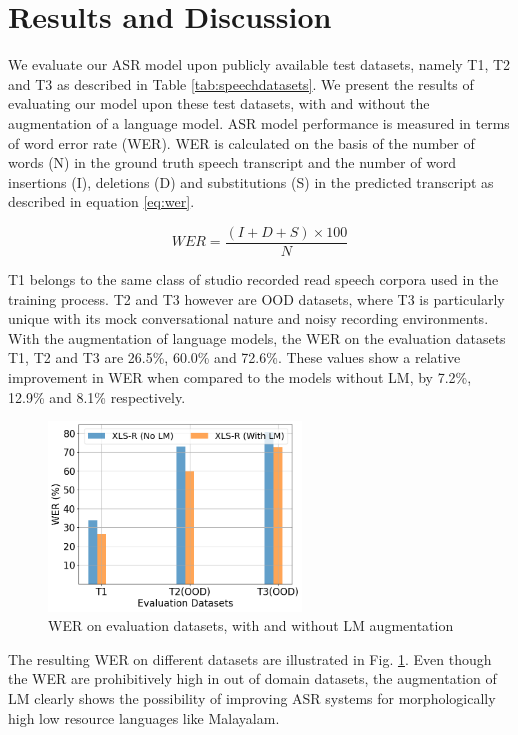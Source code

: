 \documentclass[runningheads]{llncs}
\begin{document}
\section{Results and Discussion}

We evaluate our ASR model upon publicly available test datasets, namely T1, T2 and T3 as described in Table \ref{tab:speechdatasets}.  We present the 
results of evaluating our model upon these test datasets, with and without the augmentation of a language model. ASR model performance is measured in terms of word error rate (WER). WER is calculated on the basis of the number of words (N) in the ground truth speech transcript and the number of word insertions (I), deletions (D) and  substitutions (S)  in the  predicted transcript as described in equation \ref{eq:wer}.

\begin{equation}
	\label{eq:wer}
	WER = \frac{(I+D+S) \times 100}{N}
\end{equation}


T1 belongs to the same class of studio recorded read speech corpora used in the training process. T2 and T3 however are OOD datasets, where T3 is particularly unique with its mock conversational nature and noisy recording environments. With the augmentation of language models, the WER on the evaluation datasets T1, T2 and T3 are 26.5\%, 60.0\% and 72.6\%. These values show a relative improvement in WER when compared to the models without LM, by 7.2\%, 12.9\% and 8.1\% respectively.

\begin{figure}[htpb]
    \centering
    \includegraphics[width=0.6\textwidth]{wer.png}
    \caption{WER on evaluation datasets, with and without LM augmentation}
    \label{Fig:WEReval}

\end{figure}

The resulting WER on different datasets are illustrated in Fig. \ref{Fig:WEReval}. Even though the WER are prohibitively high in out of domain datasets, the augmentation of LM clearly shows the possibility of improving ASR systems for morphologically high low resource languages like Malayalam.
\end{document}
